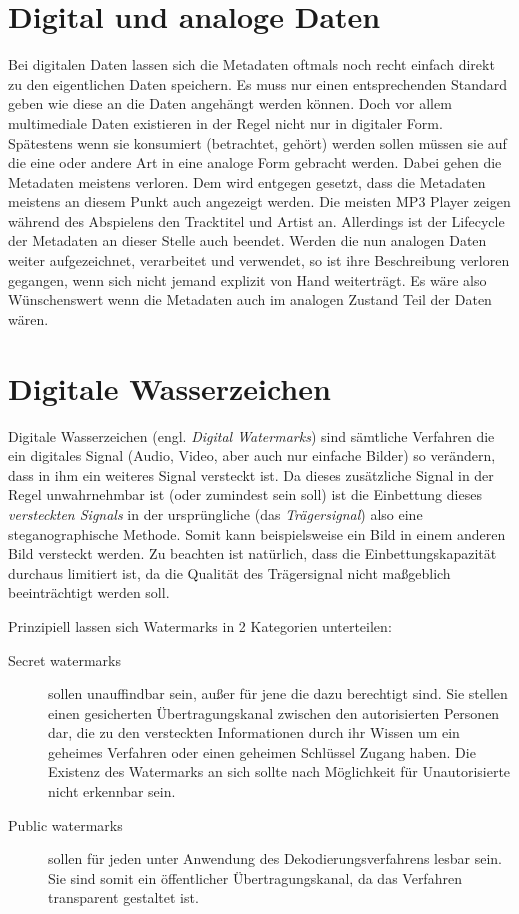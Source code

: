 \section{Digital und analoge Daten}

Bei digitalen Daten lassen sich die Metadaten oftmals noch recht einfach direkt zu den eigentlichen Daten speichern. Es muss nur einen entsprechenden Standard geben wie diese an die Daten angehängt werden können. Doch vor allem multimediale Daten existieren in der Regel nicht nur in digitaler Form. Spätestens wenn sie konsumiert (betrachtet, gehört) werden sollen müssen sie auf die eine oder andere Art in eine analoge Form gebracht werden. Dabei gehen die Metadaten meistens verloren. Dem wird entgegen gesetzt, dass die Metadaten meistens an diesem Punkt auch angezeigt werden. Die meisten MP3 Player zeigen während des Abspielens den Tracktitel und Artist an. Allerdings ist der Lifecycle der Metadaten an dieser Stelle auch beendet. Werden die nun analogen Daten weiter aufgezeichnet, verarbeitet und verwendet, so ist ihre Beschreibung verloren gegangen, wenn sich nicht jemand explizit \glqq{}von Hand\grqq{} weiterträgt. Es wäre also Wünschenswert wenn die Metadaten auch im analogen Zustand Teil der Daten wären. 

\section{Digitale Wasserzeichen}

Digitale Wasserzeichen (engl. \textit{Digital Watermarks}) sind sämtliche Verfahren die ein digitales Signal (Audio, Video, aber auch nur einfache Bilder) so verändern, dass in ihm ein weiteres Signal versteckt ist. Da dieses zusätzliche Signal in der Regel unwahrnehmbar ist (oder zumindest sein soll) ist die Einbettung dieses \textit{versteckten Signals} in der ursprüngliche (das \textit{Trägersignal}) also eine steganographische Methode.
Somit kann beispielsweise ein Bild in einem anderen Bild versteckt werden. Zu beachten ist natürlich, dass die Einbettungskapazität durchaus limitiert ist, da die Qualität des Trägersignal nicht maßgeblich beeinträchtigt werden soll. 

Prinzipiell lassen sich Watermarks in 2 Kategorien unterteilen\cite{arnold2000audio}: 

\begin{description}
	
	\item[Secret watermarks] sollen unauffindbar sein, außer für jene die dazu berechtigt sind. Sie stellen einen gesicherten Übertragungskanal zwischen den autorisierten Personen dar, die zu den versteckten Informationen durch ihr Wissen um ein geheimes Verfahren oder einen geheimen Schlüssel Zugang haben. Die Existenz des Watermarks an sich sollte nach Möglichkeit für Unautorisierte nicht erkennbar sein. 
	
	\item[Public watermarks] sollen für jeden unter Anwendung des Dekodierungsverfahrens lesbar sein. Sie sind somit ein öffentlicher Übertragungskanal, da das Verfahren transparent gestaltet ist.
	
\end{description}

